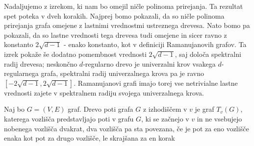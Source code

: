 Nadaljujemo z izrekom, ki nam bo omejil ničle polinoma prirejanja. Ta rezultat spet poteka v dveh korakih. Najprej bomo pokazali, da so ničle polinoma prirejanja grafa omejene z lastnimi vrednostmi ustreznega drevesa. Nato bomo pa pokazali, da so lastne vrednosti tega drevesa tudi omejene in sicer ravno z konstanto \(2\sqrt{d-1}\) - enako konstanto, kot v definiciji Ramanujanovih grafov. Ta izrek pokaže še dodatno pomembnost vrednosti \(2\sqrt{d-1}\), saj določa spektralni radij drevesa; neskončno \(d\)-regularno drevo je univerzalni krov vsakega \(d\)-regularnega grafa, spektralni radij univerzalnega krova pa je ravno \([-2\sqrt{d-1}, 2\sqrt{d-1}]\). Ramanujanovi grafi imajo torej vse netrivialne lastne vrednosti zajete v spektralnem radiju svojega univerzalnega krova\cite{hoory}.

\begin{definicija}
    Naj bo \(G=(V, E)\) graf. Drevo poti grafa \(G\) z izhodiščem v \(v\) je graf \(T_v(G)\), katerega vozlišča predstavljajo poti v grafu \(G\), ki se začnejo v \(v\) in ne vsebujejo nobenega vozlišča dvakrat, dva vozlišča pa sta povezana, če je pot za eno vozlišče enaka kot pot za drugo vozlišče, le skrajšana za en korak
\end{definicija}
